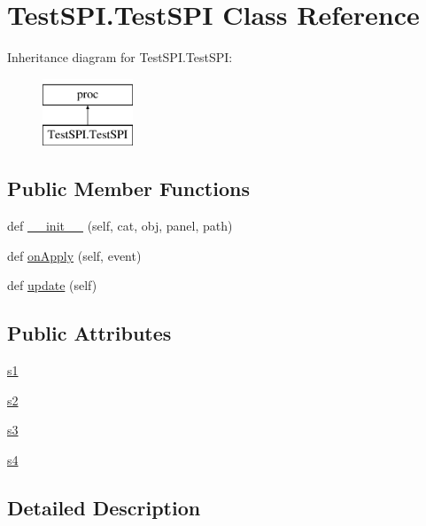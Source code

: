 \hypertarget{classTestSPI_1_1TestSPI}{}\section{Test\+S\+P\+I.\+Test\+S\+PI Class Reference}
\label{classTestSPI_1_1TestSPI}
Inheritance diagram for Test\+S\+P\+I.\+Test\+S\+PI\+:\begin{figure}[H]
\begin{center}
\leavevmode
\includegraphics[height=2.000000cm]{classTestSPI_1_1TestSPI}
\end{center}
\end{figure}
\subsection*{Public Member Functions}
\begin{DoxyCompactItemize}
\item 
def \hyperlink{classTestSPI_1_1TestSPI_abe1733d29b3ba96fda6ef9b2dd69f5f5}{\+\_\+\+\_\+init\+\_\+\+\_\+} (self, cat, obj, panel, path)
\item 
def \hyperlink{classTestSPI_1_1TestSPI_afb81e2aa5e79d416c526e5a468a233c7}{on\+Apply} (self, event)
\item 
def \hyperlink{classTestSPI_1_1TestSPI_a3decf34e1dd0ad00ae1a53d5daf690b1}{update} (self)
\end{DoxyCompactItemize}
\subsection*{Public Attributes}
\begin{DoxyCompactItemize}
\item 
\hyperlink{classTestSPI_1_1TestSPI_a914dccdc9e80b9440a840e19317d41e2}{s1}
\item 
\hyperlink{classTestSPI_1_1TestSPI_a9f001dfe102a7589fc88c9eb1aed91cc}{s2}
\item 
\hyperlink{classTestSPI_1_1TestSPI_aa4a1d8242e115a02b76a296993bf387e}{s3}
\item 
\hyperlink{classTestSPI_1_1TestSPI_a89c7f85cbef3c989e7a1f127988a403e}{s4}
\end{DoxyCompactItemize}


\subsection{Detailed Description}


